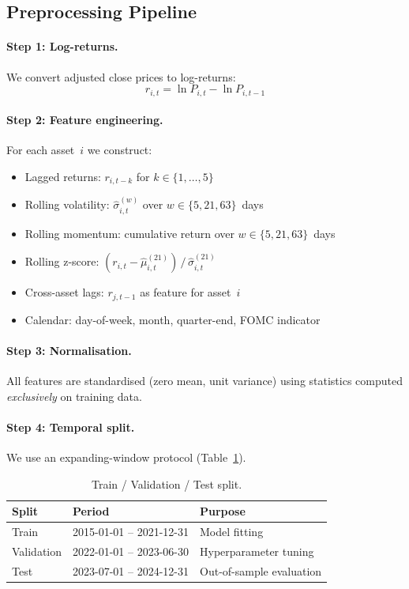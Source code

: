 \documentclass[11pt,a4paper,twocolumn]{article}
\begin{document}
\subsection{Preprocessing Pipeline}

\paragraph{Step 1: Log-returns.}
We convert adjusted close prices to log-returns:
\begin{equation}\label{eq:logret}
    r_{i,t} = \ln P_{i,t} - \ln P_{i,t-1}
\end{equation}

\paragraph{Step 2: Feature engineering.}
For each asset~$i$ we construct:
\begin{itemize}[leftmargin=*,itemsep=1pt]
    \item Lagged returns: $r_{i,t-k}$ for $k \in \{1,\ldots,5\}$
    \item Rolling volatility: $\hat{\sigma}_{i,t}^{(w)}$ over $w \in \{5,21,63\}$~days
    \item Rolling momentum: cumulative return over $w \in \{5,21,63\}$~days
    \item Rolling z-score: $(r_{i,t} - \hat{\mu}_{i,t}^{(21)}) \,/\, \hat{\sigma}_{i,t}^{(21)}$
    \item Cross-asset lags: $r_{j,t-1}$ as feature for asset~$i$
    \item Calendar: day-of-week, month, quarter-end, FOMC indicator
\end{itemize}

\paragraph{Step 3: Normalisation.}
All features are standardised (zero mean, unit variance) using statistics
computed \emph{exclusively} on training data.

\paragraph{Step 4: Temporal split.}
We use an expanding-window protocol (Table~\ref{tab:split}).

\begin{table}[H]
\centering
\caption{Train / Validation / Test split.}
\label{tab:split}
\small
\begin{tabular}{@{}lll@{}}
\toprule
\textbf{Split} & \textbf{Period} & \textbf{Purpose} \\
\midrule
Train      & 2015-01-01 -- 2021-12-31 & Model fitting \\
Validation & 2022-01-01 -- 2023-06-30 & Hyperparameter tuning \\
Test       & 2023-07-01 -- 2024-12-31 & Out-of-sample evaluation \\
\bottomrule
\end{tabular}
\end{table}
\end{document}
